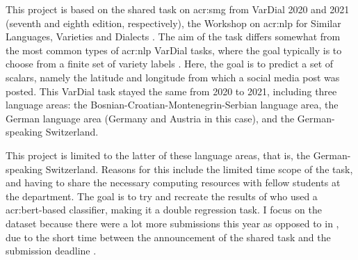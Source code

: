 \begin{comment}
The introduction can also briefly describe what methodology you will apply to reach the goal and the reasons for this choice of research methodology.
It can furthermore provide a brief summary of the main contributions of the work,
and should provide the reader with an overview of what is coming in the next sections.
You want to say more than what is explicit in the section names, if possible, but still keep the description short and to the point.
\end{comment}

This project is based on the shared task on \gls{acr:smg} from VarDial 2020 and 2021 (seventh and eighth edition, respectively), the Workshop on \gls{acr:nlp} for Similar Languages, Varieties and Dialects \citep{gamanReportVarDialEvaluation2020, chakravarthiFindingsVarDialEvaluation2021}. The aim of the task differs somewhat from the most common types of \gls{acr:nlp} VarDial tasks, where the goal typically is to choose from a finite set of variety labels \citep[1]{scherrerSocialMediaVariety2021}. Here, the goal is to predict a set of scalars, namely the latitude and longitude from which a social media post was posted. This VarDial task stayed the same from 2020 to 2021, including three language areas: the Bosnian-Croatian-Montenegrin-Serbian language area, the German language area (Germany and Austria in this case), and the German-speaking Switzerland.

This project is limited to the latter of these language areas, that is, the German-speaking Switzerland. Reasons for this include the limited time scope of the task, and having to share the necessary computing resources with fellow students at the department. The goal is to try and recreate the results of \cite{scherrerHeLjuVarDial20202020} who used a \acrshort{acr:bert}-based classifier, making it a double regression task. I focus on the \citeyear{scherrerHeLjuVarDial20202020} dataset because there were a lot more submissions this year as opposed to in \citeyear{scherrerSocialMediaVariety2021}, due to the short time between the announcement of the shared task and the submission deadline \citep[6]{chakravarthiFindingsVarDialEvaluation2021}.


